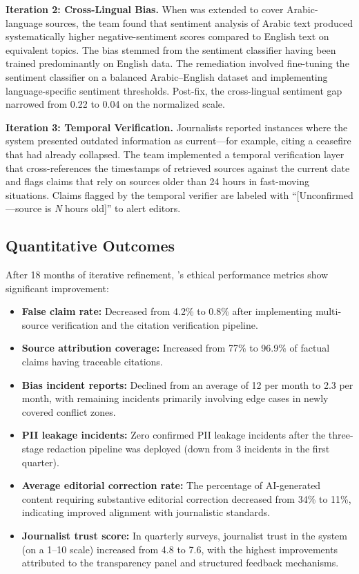 \textbf{Iteration 2: Cross-Lingual Bias.} When \ishtar{} was extended to cover Arabic-language sources, the team found that sentiment analysis of Arabic text produced systematically higher negative-sentiment scores compared to English text on equivalent topics. The bias stemmed from the sentiment classifier having been trained predominantly on English data. The remediation involved fine-tuning the sentiment classifier on a balanced Arabic--English dataset and implementing language-specific sentiment thresholds. Post-fix, the cross-lingual sentiment gap narrowed from 0.22 to 0.04 on the normalized scale.

\textbf{Iteration 3: Temporal Verification.} Journalists reported instances where the system presented outdated information as current---for example, citing a ceasefire that had already collapsed. The team implemented a temporal verification layer that cross-references the timestamps of retrieved sources against the current date and flags claims that rely on sources older than 24 hours in fast-moving situations. Claims flagged by the temporal verifier are labeled with ``[Unconfirmed---source is \emph{N} hours old]'' to alert editors.

\subsection{Quantitative Outcomes}\label{sec:ch11_ishtar_outcomes}

After 18 months of iterative refinement, \ishtar{}'s ethical performance metrics show significant improvement:

\begin{itemize}
    \item \textbf{False claim rate:} Decreased from 4.2\% to 0.8\% after implementing multi-source verification and the citation verification pipeline.
    \item \textbf{Source attribution coverage:} Increased from 77\% to 96.9\% of factual claims having traceable citations.
    \item \textbf{Bias incident reports:} Declined from an average of 12 per month to 2.3 per month, with remaining incidents primarily involving edge cases in newly covered conflict zones.
    \item \textbf{PII leakage incidents:} Zero confirmed PII leakage incidents after the three-stage redaction pipeline was deployed (down from 3 incidents in the first quarter).
    \item \textbf{Average editorial correction rate:} The percentage of AI-generated content requiring substantive editorial correction decreased from 34\% to 11\%, indicating improved alignment with journalistic standards.
    \item \textbf{Journalist trust score:} In quarterly surveys, journalist trust in the system (on a 1--10 scale) increased from 4.8 to 7.6, with the highest improvements attributed to the transparency panel and structured feedback mechanisms.
\end{itemize}

